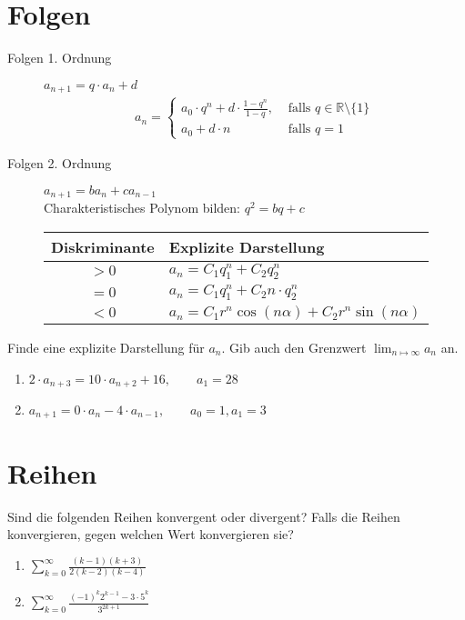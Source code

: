 \documentclass[11pt, a4paper]{article}
\begin{document}
\section{Folgen}
\begin{description}
	\item[Folgen 1. Ordnung] $a_{n+1} = q \cdot a_n + d$
		\begin{align*}
			a_n = \begin{cases}
				a_0 \cdot q^n + d \cdot \frac{1-q^n}{1-q}, &\text{ falls } q \in \mathbb{R} \setminus \{1\} \\
				a_0 + d \cdot n &\text{ falls } q=1
					\end{cases}
		\end{align*}
	\item[Folgen 2. Ordnung] $a_{n+1} = b a_n + c a_{n-1}$ \vspace{0.3cm} \\
		Charakteristisches Polynom bilden: $q^2 = bq+c$ \vspace{0.3cm} \\
		\begin{tabular}{|c|l|}
			\hline
			Diskriminante & Explizite Darstellung \\ \hline
			$>0$ & $a_n = C_1 q_1^n + C_2 q_2^n$ \\
			$=0$ & $a_n = C_1 q_1^n + C_2 n \cdot q_2^n$ \\
			$<0$ & $a_n = C_1 r^n \cos(n\alpha) + C_2 r^n \sin(n\alpha)$ \\ \hline
		\end{tabular}
\end{description}
Finde eine explizite Darstellung für $a_n$. Gib auch den Grenzwert $\displaystyle\lim_{n \mapsto \infty} a_n$ an.
\begin{enumerate}
	\item $2 \cdot a_{n+3} = 10 \cdot a_{n+2} + 16, \qquad a_1 = 28$
	\item $a_{n+1} = 0 \cdot a_n - 4 \cdot a_{n-1}, \qquad a_0 = 1, a_1 = 3$
\end{enumerate}

\section{Reihen}
Sind die folgenden Reihen konvergent oder divergent? Falls die Reihen konvergieren, gegen welchen Wert konvergieren sie?
\begin{enumerate}
	\item $\displaystyle \sum_{k=0}^\infty \frac{(k-1)(k+3)}{2(k-2)(k-4)}$
	\item $\displaystyle \sum_{k=0}^\infty \frac{(-1)^k 2^{k-1} - 3 \cdot 5^k}{3^{2k+1}}$
\end{enumerate}
\end{document}
